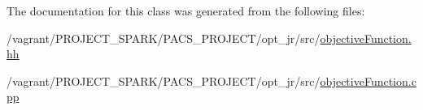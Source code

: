 The documentation for this class was generated from the following files\-:\begin{DoxyCompactItemize}
\item 
/vagrant/\-P\-R\-O\-J\-E\-C\-T\-\_\-\-S\-P\-A\-R\-K/\-P\-A\-C\-S\-\_\-\-P\-R\-O\-J\-E\-C\-T/opt\-\_\-jr/src/\hyperlink{objectiveFunction_8hh}{objective\-Function.\-hh}\item 
/vagrant/\-P\-R\-O\-J\-E\-C\-T\-\_\-\-S\-P\-A\-R\-K/\-P\-A\-C\-S\-\_\-\-P\-R\-O\-J\-E\-C\-T/opt\-\_\-jr/src/\hyperlink{objectiveFunction_8cpp}{objective\-Function.\-cpp}\end{DoxyCompactItemize}
